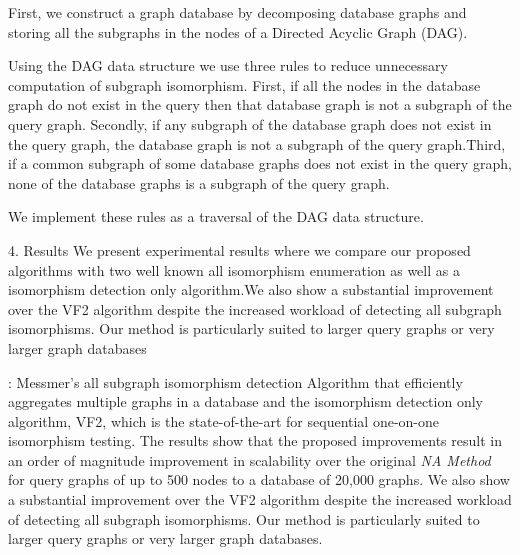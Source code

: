 First, we construct a graph database by decomposing database graphs and storing all the subgraphs in the nodes of a Directed Acyclic Graph (DAG).


Using the DAG data structure we use three rules to reduce unnecessary computation of subgraph isomorphism. First, if all the nodes in the database graph do not exist in the query then that database graph is not a subgraph of the query graph. Secondly, if any subgraph of the database graph does not exist in the query graph, the database graph is not a subgraph of the query graph.Third, if a common subgraph of some database graphs does not exist in the query graph, none of the database graphs is a subgraph of the query graph.

We implement these rules as a traversal of the DAG data structure. 


4. Results
We present experimental results where we compare our proposed algorithms with two well known all isomorphism enumeration as well as a isomorphism detection only algorithm.We also show a substantial improvement over the VF2 algorithm despite the increased workload of detecting all subgraph isomorphisms. Our method is particularly suited to larger query graphs or very larger graph databases

: Messmer's all subgraph isomorphism detection Algorithm that efficiently aggregates multiple graphs in a database and the isomorphism detection only algorithm, VF2, which is the state-of-the-art for sequential one-on-one isomorphism testing. The results show that the proposed improvements result in an order of magnitude improvement in scalability over the original \textit{NA Method}  for query graphs of up to 500 nodes to a database of 20,000 graphs. We also show a substantial improvement over the VF2 algorithm despite the increased workload of detecting all subgraph isomorphisms. Our method is particularly suited to larger query graphs or very larger graph databases.

